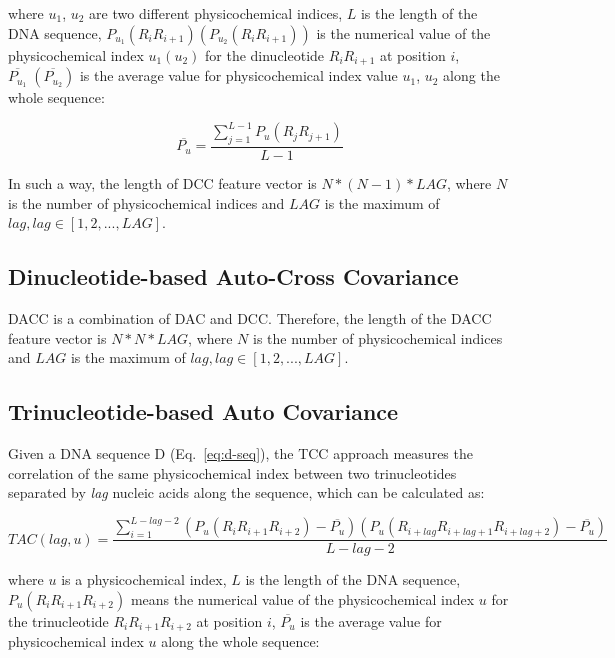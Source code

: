 where $u_{1}$, $u_{2}$ are two different physicochemical indices, $L$ is the length of the DNA sequence, $P_{u_{1}}(R_{i}R_{i+1}) (P_{u_{2}}(R_{i}R_{i+1}))$ is the numerical value of the physicochemical index $u_{1}(u_{2})$ for the dinucleotide $R_{i}R_{i+1}$ at position $i$, $\overline{P_{u_{1}}}\;(\overline{P_{u_{2}}})$ is the average value for physicochemical index value $u_{1}$, $u_{2}$ along the whole sequence:

\begin{equation}\label{eq:DAC-PU2}
    \overline{P_{u}} = \frac{\sum_{j=1}^{L-1}P_{u}(R_{j}R_{j+1})}{L-1}
\end{equation}

In such a way, the length of \gls{DCC} feature vector is $N*(N-1)*LAG$, where $N$ is the number of physicochemical indices and $LAG$ is the maximum of $lag, lag \in [1,2,...,LAG]$.

\subsection{Dinucleotide-based Auto-Cross Covariance}
\gls{DACC} is a combination of \gls{DAC} and \gls{DCC}. Therefore, the length of the \gls{DACC} feature vector is $N*N*LAG$, where $N$ is the number of physicochemical indices and $LAG$ is the maximum of $lag, lag \in [1,2,...,LAG]$.


\subsection{Trinucleotide-based Auto Covariance}
Given a DNA sequence D (Eq.~\ref{eq:d-seq}), the \gls{TCC} approach measures the correlation of the same physicochemical index between two trinucleotides separated by \textit{lag} nucleic acids along the sequence, which can be calculated as:

\begin{equation}\label{eq:tac}
    TAC(lag,u) = 
\frac
{
\sum_{i=1}^{L-lag-2}(P_{u}(R_{i}R_{i+1}R_{i+2}) - \overline{P_{u}})(P_{u}(R_{i+lag}R_{i+lag+1}R_{i+lag+2}) - \overline{P_{u}})
}
{
L-lag-2
}
\end{equation}

where $u$ is a physicochemical index, $L$ is the length of the DNA sequence, $P_{u}(R_{i}R_{i+1}R_{i+2})$ means the numerical value of the physicochemical index $u$ for the trinucleotide $R_{i}R_{i+1}R_{i+2}$ at position $i$, $\overline{P_{u}}$ is the average value for physicochemical index $u$ along the whole sequence:

